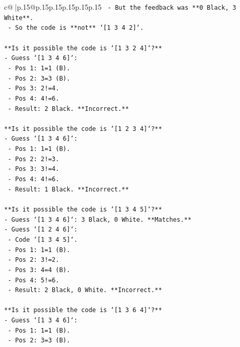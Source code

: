 \documentclass{article}
\begin{document}
{\begin{supertabular}{c@{$\;$}|p{.15\linewidth}@{}p{.15\linewidth}p{.15\linewidth}p{.15\linewidth}p{.15\linewidth}p{.15\linewidth}}
{{{\texttt{    {-}   But the feedback was **0 Black, 3 White**.} \\
\texttt{    {-}   So the code is **not** `{[}1 3 4 2{]}`.} \\
\\ 
\texttt{**Is it possible the code is `{[}1 3 2 4{]}`?**} \\
\texttt{{-}   Guess `{[}1 3 4 6{]}`:} \\
\texttt{    {-}   Pos 1: 1=1 (B).} \\
\texttt{    {-}   Pos 2: 3=3 (B).} \\
\texttt{    {-}   Pos 3: 2!=4.} \\
\texttt{    {-}   Pos 4: 4!=6.} \\
\texttt{    {-}   Result: 2 Black. **Incorrect.**} \\
\\ 
\texttt{**Is it possible the code is `{[}1 2 3 4{]}`?**} \\
\texttt{{-}   Guess `{[}1 3 4 6{]}`:} \\
\texttt{    {-}   Pos 1: 1=1 (B).} \\
\texttt{    {-}   Pos 2: 2!=3.} \\
\texttt{    {-}   Pos 3: 3!=4.} \\
\texttt{    {-}   Pos 4: 4!=6.} \\
\texttt{    {-}   Result: 1 Black. **Incorrect.**} \\
\\ 
\texttt{**Is it possible the code is `{[}1 3 4 5{]}`?**} \\
\texttt{{-}   Guess `{[}1 3 4 6{]}`: 3 Black, 0 White. **Matches.**} \\
\texttt{{-}   Guess `{[}1 2 4 6{]}`:} \\
\texttt{    {-}   Code `{[}1 3 4 5{]}`.} \\
\texttt{    {-}   Pos 1: 1=1 (B).} \\
\texttt{    {-}   Pos 2: 3!=2.} \\
\texttt{    {-}   Pos 3: 4=4 (B).} \\
\texttt{    {-}   Pos 4: 5!=6.} \\
\texttt{    {-}   Result: 2 Black, 0 White. **Incorrect.**} \\
\\ 
\texttt{**Is it possible the code is `{[}1 3 6 4{]}`?**} \\
\texttt{{-}   Guess `{[}1 3 4 6{]}`:} \\
\texttt{    {-}   Pos 1: 1=1 (B).} \\
\texttt{    {-}   Pos 2: 3=3 (B).} \\
}}}
\end{supertabular}}
\end{document}
